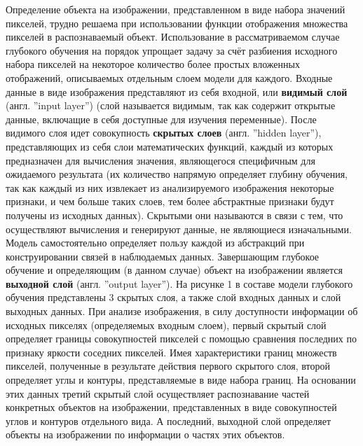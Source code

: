 \documentclass[bachelor, och, coursework]{SCWorks}
\begin{document}
        Определение объекта на изображении, представленном в виде набора значений пикселей, трудно решаема при использовании функции отображения множества пикселей в распознаваемый объект. Использование в рассматриваемом случае глубокого обучения на порядок упрощает задачу за счёт разбиения исходного набора пикселей на некоторое количество более простых вложенных отображений, описываемых отдельным слоем модели для каждого. Входные данные в виде изображения представляют из себя входной, или \textbf{видимый слой} (англ. ''input layer'') (слой называется видимым, так как содержит открытые данные, включащие в себя доступные для изучения переменные). После видимого слоя идет совокупность \textbf{скрытых слоев} (англ. ''hidden layer''), представляющих из себя слои математических функций, каждый из которых предназначен для вычисления значения, являющегося специфичным для ожидаемого результата (их количество напрямую определяет глубину обучения, так как каждый из них извлекает из анализируемого изображения некоторые признаки, и чем больше таких слоев, тем более абстрактные признаки будут получены из исходных данных). Скрытыми они называются в связи с тем, что осуществляют вычисления и генерируют данные, не являющиеся изначальными. Модель самостоятельно определяет пользу каждой из абстракций при конструировании связей в наблюдаемых данных. Завершающим глубокое обучение и определяющим (в данном случае) объект на изображении является \textbf{выходной слой} (англ. ''output layer''). На рисунке 1 в составе модели глубокого обучения представлены 3 скрытых слоя, а также слой входных данных и слой выходных данных. При анализе изображения, в силу доступности информации об исходных пикселях (определяемых входным слоем), первый скрытый слой определяет границы совокупностей пикселей с помощью сравнения последних по признаку яркости соседних пикселей. Имея характеристики границ множеств пикселей, полученные в результате действия первого скрытого слоя, второй определяет углы и контуры, представляемые в виде набора границ. На основании этих данных третий скрытый слой осуществляет распознавание частей конкретных объектов на изображении, представленных в виде совокупностей углов и контуров отдельного вида. А последний, выходной слой определяет объекты на изображении по информации о частях этих объектов. 
\end{document}
